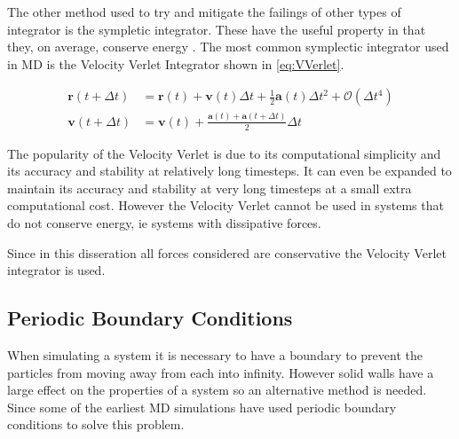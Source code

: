 \documentclass[12pt]{UoAthesis}
\begin{document}
The other method used to try and mitigate the failings of other types
of integrator is the sympletic integrator.  These have the useful
property in that they, on average, conserve energy
\cite{Hairer2003}. The most common symplectic integrator used in MD is
the Velocity Verlet Integrator \cite{Swope1982} shown in
\eqref{eq:VVerlet}.

\begin{subequations}
\label{eq:VVerlet}
\begin{align}
 \mathbf{r}(t + \Delta t) &= \mathbf{r}(t) + \mathbf{v}(t) \Delta t 
 + \frac{1}{2}\mathbf{a}(t) \Delta t^2 + \mathcal{O}(\Delta t^4)
 \label{eq:VVerletpos} \\
 \mathbf{v}(t+\Delta t) &= \mathbf{v}(t) + \frac{\mathbf{a}(t) 
   + \mathbf{a}(t+\Delta t)}{2}\Delta t
 \label{eq:VVerletVel}
\end{align}
\end{subequations}

The popularity of the Velocity Verlet is due to its computational
simplicity and its accuracy and stability at relatively long
timesteps. It can even be expanded\cite{Khakimov2002} to maintain its
accuracy and stability at very long timesteps at a small extra
computational cost. However the Velocity Verlet cannot be used in
systems that do not conserve energy, ie systems with dissipative
forces.

Since in this disseration all forces considered are conservative the
Velocity Verlet integrator is used.

\subsection{Periodic Boundary Conditions}

When simulating a system it is necessary to have a boundary to prevent
the particles from moving away from each into infinity.  However solid
walls have a large effect on the properties of a system so an
alternative method is needed.  Since some of the earliest MD
simulations \cite{Alder1959} have used periodic boundary conditions to
solve this problem.  
\end{document}

